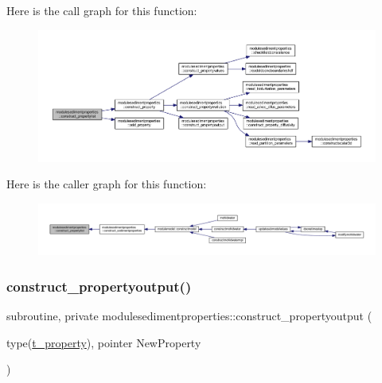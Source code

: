 Here is the call graph for this function\+:\nopagebreak
\begin{figure}[H]
\begin{center}
\leavevmode
\includegraphics[width=350pt]{namespacemodulesedimentproperties_abc91092616fbf4edf02daa5a7b1fcbb9_cgraph}
\end{center}
\end{figure}
Here is the caller graph for this function\+:\nopagebreak
\begin{figure}[H]
\begin{center}
\leavevmode
\includegraphics[width=350pt]{namespacemodulesedimentproperties_abc91092616fbf4edf02daa5a7b1fcbb9_icgraph}
\end{center}
\end{figure}
\mbox{\label{namespacemodulesedimentproperties_ae799f87453bb5cd4088f0289710bf961}} 
\subsubsection{\texorpdfstring{construct\+\_\+propertyoutput()}{construct\_propertyoutput()}}
{\footnotesize\ttfamily subroutine, private modulesedimentproperties\+::construct\+\_\+propertyoutput (\begin{DoxyParamCaption}\item[{type(\mbox{\hyperlink{structmodulesedimentproperties_1_1t__property}{t\+\_\+property}}), pointer}]{New\+Property }\end{DoxyParamCaption})\hspace{0.3cm}{\ttfamily [private]}}

